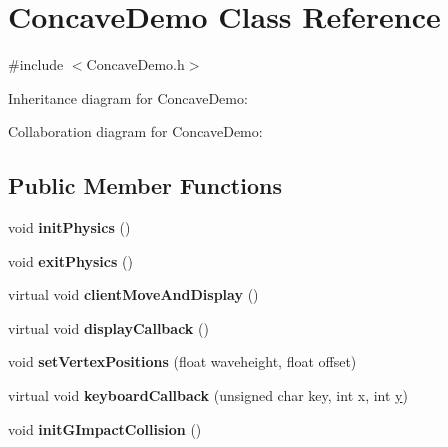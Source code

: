 \hypertarget{class_concave_demo}{\section{Concave\+Demo Class Reference}
\label{class_concave_demo}
}


{\ttfamily \#include $<$Concave\+Demo.\+h$>$}



Inheritance diagram for Concave\+Demo\+:


Collaboration diagram for Concave\+Demo\+:
\subsection*{Public Member Functions}
\begin{DoxyCompactItemize}
\item 
\hypertarget{class_concave_demo_a895b39fc88a7a9ab960cd6c4ab803f8b}{void {\bfseries init\+Physics} ()}\label{class_concave_demo_a895b39fc88a7a9ab960cd6c4ab803f8b}

\item 
\hypertarget{class_concave_demo_a23b77cdb3261e19cc27d7ee8d10992c8}{void {\bfseries exit\+Physics} ()}\label{class_concave_demo_a23b77cdb3261e19cc27d7ee8d10992c8}

\item 
\hypertarget{class_concave_demo_a32f28ab7f20e14d615f37d9ebea8a699}{virtual void {\bfseries client\+Move\+And\+Display} ()}\label{class_concave_demo_a32f28ab7f20e14d615f37d9ebea8a699}

\item 
\hypertarget{class_concave_demo_a275b2489931375be5bc3d7693d7a770f}{virtual void {\bfseries display\+Callback} ()}\label{class_concave_demo_a275b2489931375be5bc3d7693d7a770f}

\item 
\hypertarget{class_concave_demo_a238b9e8d5f2cee0a4a4a4eaaea38acd1}{void {\bfseries set\+Vertex\+Positions} (float waveheight, float offset)}\label{class_concave_demo_a238b9e8d5f2cee0a4a4a4eaaea38acd1}

\item 
\hypertarget{class_concave_demo_a8656c26839a35ec08c5a5de0f92fdbf5}{virtual void {\bfseries keyboard\+Callback} (unsigned char key, int x, int \hyperlink{_ice_utils_8h_aa7ffaed69623192258fb8679569ff9ba}{y})}\label{class_concave_demo_a8656c26839a35ec08c5a5de0f92fdbf5}

\item 
\hypertarget{class_concave_demo_a647d86d86a75c1b2cedc9386ae0559df}{void {\bfseries init\+G\+Impact\+Collision} ()}\label{class_concave_demo_a647d86d86a75c1b2cedc9386ae0559df}


\end{DoxyCompactItemize}
